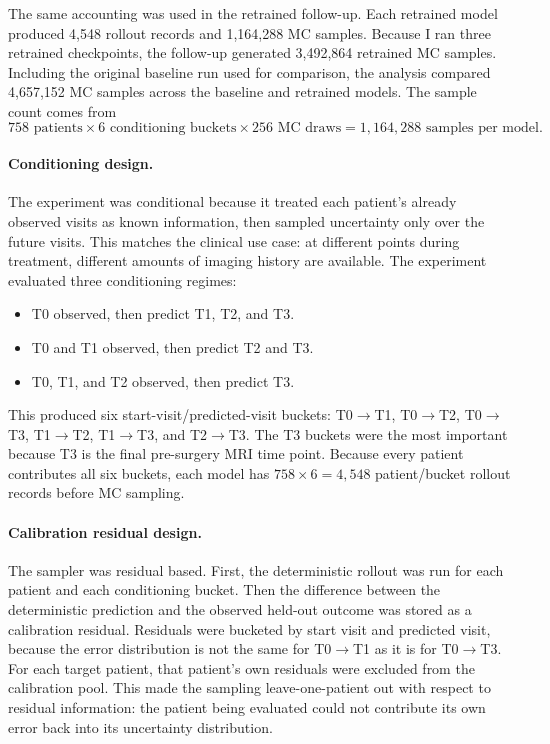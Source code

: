\documentclass[11pt]{article}
\begin{document}
The same accounting was used in the retrained follow-up. Each retrained model
produced 4,548 rollout records and 1,164,288 MC samples. Because I ran three
retrained checkpoints, the follow-up generated 3,492,864 retrained MC samples.
Including the original baseline run used for comparison, the analysis compared
4,657,152 MC samples across the baseline and retrained models. The sample count
comes from
\[
758\text{ patients} \times 6\text{ conditioning buckets} \times 256
\text{ MC draws} = 1{,}164{,}288\text{ samples per model}.
\]

\paragraph{Conditioning design.}
The experiment was conditional because it treated each patient's already observed
visits as known information, then sampled uncertainty only over the future
visits. This matches the clinical use case: at different points during
treatment, different amounts of imaging history are available.
The experiment evaluated three conditioning regimes:
\begin{itemize}
    \item T0 observed, then predict T1, T2, and T3.
    \item T0 and T1 observed, then predict T2 and T3.
    \item T0, T1, and T2 observed, then predict T3.
\end{itemize}
This produced six start-visit/predicted-visit buckets:
T0$\rightarrow$T1, T0$\rightarrow$T2, T0$\rightarrow$T3,
T1$\rightarrow$T2, T1$\rightarrow$T3, and T2$\rightarrow$T3. The T3 buckets
were the most important because T3 is the final pre-surgery MRI time point.
Because every patient contributes all six buckets, each model has
$758 \times 6 = 4{,}548$ patient/bucket rollout records before MC sampling.

\paragraph{Calibration residual design.}
The sampler was residual based. First, the deterministic rollout was run for
each patient and each conditioning bucket. Then the difference between the
deterministic prediction and the observed held-out outcome was stored as a
calibration residual. Residuals were bucketed by start visit and predicted visit,
because the error distribution is not the same for T0$\rightarrow$T1 as it is
for T0$\rightarrow$T3. For each target patient, that patient's own residuals
were excluded from the calibration pool. This made the sampling leave-one-patient
out with respect to residual information: the patient being evaluated could not
contribute its own error back into its uncertainty distribution.
\end{document}
